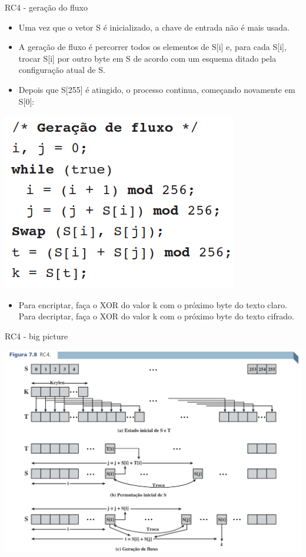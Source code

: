 \begin{frame}{RC4 - geração do fluxo}
    \begin{itemize}


        \item    Uma vez que o vetor S é inicializado, a chave de entrada não é mais usada.
        \item A geração de fluxo é percorrer todos os elementos de S[i] e, para cada S[i], trocar S[i] por outro byte em S de acordo com um esquema
              ditado pela configuração atual de S.

        \item Depois que S[255] é atingido, o processo continua, começando novamente
              em S[0]:

    \end{itemize}

    \centering
    \includegraphics[width=0.4\linewidth]{Figuras/rc4-geracao-de-fluxo.png}

    \begin{itemize}
        \item Para encriptar, faça o XOR do valor k com o próximo byte do texto claro. Para decriptar, faça o XOR do
              valor k com o próximo byte do texto cifrado.
    \end{itemize}

\end{frame}


\begin{frame}{RC4 - big picture}


    \centering
    \includegraphics[width=0.75\linewidth]{Figuras/rc4-big-picture.png}



\end{frame}


